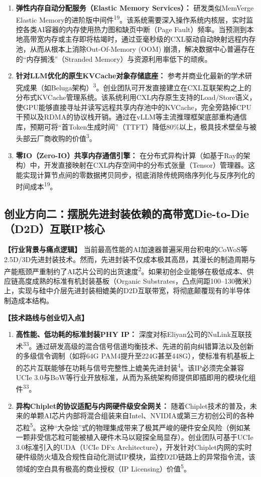 \begin{enumerate}
  \item \textbf{弹性内存自动分配服务（Elastic Memory Services）：} 研发类似MemVerge Elastic Memory的进阶版中间件\textsuperscript{19}。该系统需要深入操作系统内核层，实时监控各类AI容器的内存使用热力图和缺页中断（Page Fault）频率。当预测到本地高带宽内存或主存即将枯竭时，通过亚毫秒级的CXL驱动自动映射远程内存池，从而从根本上消除Out-Of-Memory (OOM) 崩溃，解决数据中心普遍存在的``内存搁浅''（Stranded Memory）与资源利用率低下的顽疾。
  \item \textbf{针对LLM优化的原生KVCache对象存储底座：} 参考并商业化最新的学术研究成果（如Beluga架构）\textsuperscript{3}。创业团队可开发直接建立在CXL互联架构之上的分布式KVCache管理系统。该系统利用CXL内存原生支持的Load/Store语义，使GPU能够直接寻址并读写远程共享内存池中的KVCache，完全旁路掉CPU干预以及RDMA的协议栈开销。通过在vLLM等主流推理框架底部重构通信库，预期可将``首Token生成时间''（TTFT）降低80\%以上，极具技术壁垒与被头部云厂商收购的价值\textsuperscript{3}。
  \item \textbf{零IO（Zero-IO）共享内存通信引擎：} 在分布式异构计算（如基于Ray的架构）中，开发直接映射在CXL内存空间中的分布式张量（Tensor）管理器。这能实现计算节点间的零数据拷贝同步，彻底消除传统网络序列化与反序列化的时间成本\textsuperscript{19}。
\end{enumerate}

\subsection{创业方向二：摆脱先进封装依赖的高带宽Die-to-Die（D2D）互联IP核心}

\textbf{【行业背景与痛点逻辑】} 当前最高性能的AI加速器普遍采用台积电的CoWoS等2.5D/3D先进封装技术。然而，先进封装不仅成本极其高昂，其漫长的制造周期与产能瓶颈严重制约了AI芯片公司的出货速度\textsuperscript{2}。如果初创企业能够在极低成本、供应链高度成熟的标准有机封装基板（Organic Substrates，凸点间距100--130微米）上，实现与硅中介层先进封装相媲美的D2D互联带宽，将彻底颠覆现有的半导体制造成本结构。

\textbf{【技术路线与创业切入点】}

\begin{enumerate}
  \item \textbf{高性能、低功耗的标准封装PHY IP：} 深度对标Eliyan公司的NuLink互联技术\textsuperscript{33}。通过研发高级的混合信号信道均衡技术、先进的前向纠错算法以及创新的多级信令调制（如将64G PAM4提升至224G甚至448G），使标准有机基板上的芯片互联能够在功耗与信号完整性上媲美先进封装\textsuperscript{4}。该IP必须完全兼容UCIe 3.0与BoW等行业开放标准，从而为系统架构师提供即插即用的模块化组件\textsuperscript{33}。
  \item \textbf{异构Chiplet的协议适配与内网硬件级安全网关：} 随着Chiplet技术的普及，未来的单颗AI芯片内部将混合组装来自Intel、NVIDIA或第三方初创公司的各种芯粒\textsuperscript{5}。这种``大杂烩''式的物理集成带来了极其严峻的硬件安全风险（例如某一颗非受信芯粒可能被植入硬件木马以窥探全局显存）。创业团队可基于UCIe 3.0标准引入的UDA（UCIe DFx Architecture），开发针对Chiplet内网的实时硬件级防火墙及合规性自动化测试IP模块，监控D2D链路上的异常指令流，该领域的空白具有极高的商业授权（IP Licensing）价值\textsuperscript{5}。
\end{enumerate}


